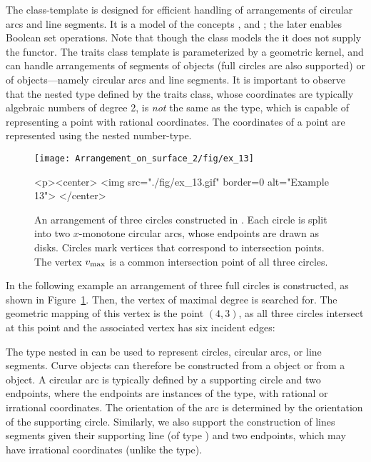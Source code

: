 The  class-template is designed
for efficient handling of arrangements of circular arcs and line segments.
It is a model of the concepts ,
 and
; the later enables
Boolean set operations. Note that though the class models the
 it does not supply the
 functor. The traits class template 
is parameterized by a geometric kernel, and can handle arrangements of
segments of  objects (full circles are also supported)
or of  objects---namely circular arcs and line segments.
It is important to observe that the nested  type defined by the
traits class, whose coordinates are typically algebraic numbers of degree 2,
is {\em not} the same as the  type, which is capable of
representing a point with rational coordinates. The coordinates of a
point are represented using the nested  number-type.

\begin{figure}[t]
\begin{ccTexOnly}
  \begin{center}
  \texttt{[image: Arrangement\_on\_surface\_2/fig/ex\_13]}
  \end{center}
\end{ccTexOnly}
\begin{ccHtmlOnly}
  <p><center>
  <img src="./fig/ex_13.gif" border=0 alt="Example 13">
  </center>
\end{ccHtmlOnly}
\caption{An arrangement of three circles constructed in
. Each circle is split into two $x$-monotone
circular arcs, whose endpoints are drawn as disks. Circles
mark vertices that correspond to intersection points. The vertex
$v_{\rm max}$ is a common intersection point of all three
circles.\label{arr_fig:ex_13}}
\end{figure}

In the following example an arrangement of three full circles is
constructed, as shown in Figure~\ref{arr_fig:ex_13}. Then, the vertex
of maximal degree is searched for. The geometric mapping of this
vertex is the point $(4,3)$, as all three circles intersect at this point
and the associated vertex has six incident edges:


The  type nested in  can be
used to represent circles, circular arcs, or line segments. Curve objects
can therefore be constructed from a  object or from
a  object. A circular arc is typically defined by
a supporting circle and two endpoints, where the endpoints are instances
of the  type, with rational or irrational coordinates. The
orientation of the arc is determined by the orientation of the supporting
circle. Similarly, we also support the construction of lines segments given
their supporting line (of type ) and two endpoints, which
may have irrational coordinates (unlike the  type).

